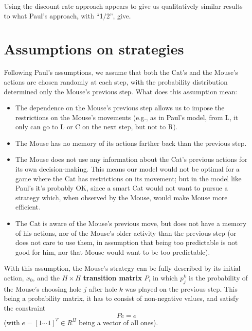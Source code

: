\documentclass[12pt]{article}
\begin{document}
Using the discount rate approach appears to give us qualitatively similar results to what Paul's approach, with ``1/2'', give.

\section{Assumptions on strategies} 
\label{sec:pq}

Following Paul's assumptions, we assume that both the Cat's and the
Mouse's actions are chosen randomly at each step, with the probability
distribution determined only the Mouse's previous step. What does this
assumption mean:
\begin{itemize}

\item The dependence on the Mouse's previous step allows us to impose the restrictions on the Mouse's movements (e.g., as in Paul's model, from L, it  only can go to L or C on the next step, but not to R).

\item The Mouse has no memory of its actions farther back than the previous step.

\item The Mouse does not use any information about the Cat's previous actions for its own decision-making. This means our model would not be optimal for a game where the Cat has restrictions on its movement; but in the model like Paul's it's probably OK, since a smart Cat would not want to pursue a strategy which, when observed by the Mouse, would make Mouse more efficient.

\item The Cat is aware of the Mouse's previous move, but does not have a memory of his actions, nor of the Mouse's older activity than the previous step (or does not care to use them, in assumption that being too predictable is not good for him, nor that Mouse would want to be too predictable).
\end{itemize}

With this assumption, the Mouse's strategy can be fully described by its initial action, $x_0$, and the $H \times H$ {\bf transition matrix} $P$, in which $p^k_j$ is the probability of the Mouse's choosing hole $j$ after hole $k$ was played on the previous step. This being a probability matrix, it has to consist of non-negative values, and satisfy the constraint
\begin{equation}
\label{eq:pe}
P e= e
\end{equation}
(with $e = [1 \cdots 1 ]^T \in R^H$ being a vector of all ones). 
\end{document}

